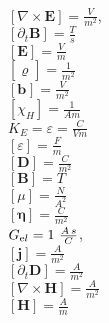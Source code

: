 \documentclass[10pt,reprint,aps,onecolumn,nofootinbib]{revtex4-2}
\def\boldsymbol#1{#1}%
\def\mathcal#1{#1}%
\def\swirlarrow{}%
\DeclareRobustCommand{\swirlarrow}{%
    \mathchoice{\mkern-2mu\scriptstyle\boldsymbol{\circlearrowleft}}%
    {\mkern-2mu\scriptstyle\boldsymbol{\circlearrowleft}}%
    {\mkern-2mu\scriptscriptstyle\boldsymbol{\circlearrowleft}}%
    {\mkern-2mu\scriptscriptstyle\boldsymbol{\circlearrowleft}}%
}
\begin{document}
\\
\scriptsize $[\nabla\times\mathbf E]=\tfrac{V}{m^{2}}$,\\
$[\partial_t\mathbf B]=\tfrac{T}{s}$
\\ \scriptsize $[\mathbf E]=\tfrac{V}{m}$
\\ $[\bm{\varrho}_{\swirlarrow}]=\tfrac{1}{m^{2}}$
\\
\scriptsize $[\mathbf b_{\swirlarrow}]=\tfrac{V}{m^{2}}$
\\
\scriptsize $[\chi_H]=\tfrac{1}{Am}$
\\
$\mathcal K_E = \varepsilon = \frac{C}{Vm}$
\\
\scriptsize $[\varepsilon]=\tfrac{F}{m}$\\
$[\mathbf D]=\tfrac{C}{m^{2}}$
\\
\scriptsize $[\mathbf B]=T $\\
$[\mu]=\tfrac{N}{A^{2}}$
\\
\scriptsize $[\bm{\eta}]=\tfrac{C}{m^{2}}$
\\
\scriptsize $\mathcal G_{\textrm el}=1~\tfrac{A \, s}{C}$,\\
$[\mathbf j]=\tfrac{A}{m^{2}}$
\\
\scriptsize $[\partial_t\mathbf D]=\tfrac{A}{m^{2}}$\\
$[\nabla\times\mathbf H]=\tfrac{A}{m^{2}}$
\\ \scriptsize $[\mathbf H]=\tfrac{A}{m}$
\end{document}
